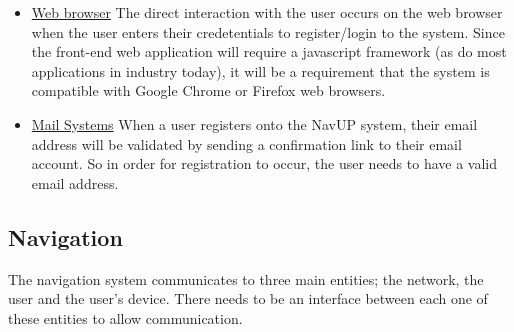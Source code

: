 \documentclass[runningheads,a4paper]{article}
\begin{document}
\begin{itemize}
\item \underline{Web browser} The direct interaction with the user occurs on the web browser when the user enters their credetentials to register/login to the system. Since the front-end web application will require a javascript framework (as do most applications in industry today), it will be a requirement that the system is compatible with Google Chrome or Firefox web browsers. 

\item \underline{Mail Systems} When a user registers onto the NavUP system, their email address will be validated by sending a confirmation link to their email account. So in order for registration to occur, the user needs to have a valid email address. 

\end{itemize}
\subsection{Navigation}
The navigation system communicates to three main entities; the network, the user and the user’s device. There needs to be an interface between each one of these entities to allow communication.
\end{document}
